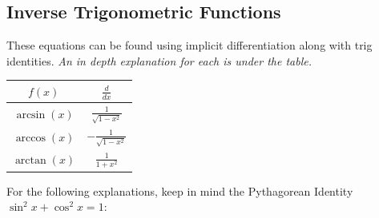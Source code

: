 \documentclass[12pt]{article}
\begin{document}
        \subsection{Inverse Trigonometric Functions}
            These equations can be found using implicit differentiation along with trig identities. \textit{An in depth explanation for each is under the table.}
            \begin{center}
                \begin{tabular}{|c|c|}
                    \hline
                    $f(x)$ & $\frac{d}{dx}$ \\
                    \hline \hline
                    $\arcsin(x)$ & $\frac{1}{\sqrt{1-x^2}}$ \\
                    \hline
                    $\arccos(x)$ & $-\frac{1}{\sqrt{1-x^2}}$ \\
                    \hline
                    $\arctan(x)$ & $\frac{1}{1+x^2}$ \\
                    \hline
                \end{tabular}
            \end{center}
            For the following explanations, keep in mind the \hypertarget{invdertrig}{Pythagorean Identity} $\sin^2{x} + \cos^2{x} = 1$:
\end{document}
